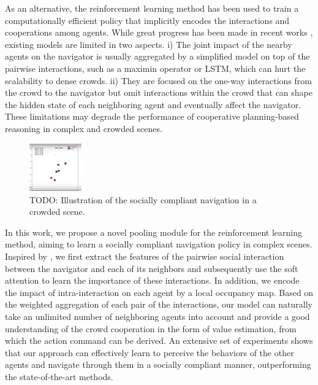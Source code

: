 \documentclass[letterpaper, 10 pt, conference]{ieeeconf}  %
\begin{document}
As an alternative, the reinforcement learning method has been used to train a computationally efficient policy that implicitly encodes the interactions and cooperations among agents. While great progress has been made in recent works \cite{chen_decentralized_2016,chen_socially_2017,long_towards_2017,everett_motion_2018}, existing models are limited in two aspects. i) The joint impact of the nearby agents on the navigator is usually aggregated by a simplified model on top of the pairwise interactions, such as a maximin operator or LSTM, which can hurt the scalability to dense crowds. ii) They are focused on the one-way interactions from the crowd to the navigator but omit interactions within the crowd that can shape the hidden state of each neighboring agent and eventually affect the navigator. These limitations may degrade the performance of cooperative planning-based reasoning in complex and crowded scenes. 

\begin{figure} [t]
  \captionsetup{font=small}
  \includegraphics[width=0.2\textwidth]{figures/overview}
  \caption{TODO: Illustration of the socially compliant navigation in a crowded scene.}
  \label{fig:overview}
\end{figure}

In this work, we propose a novel pooling module for the reinforcement learning method, aiming to learn a socially compliant navigation policy in complex scenes. Inspired by \cite{alahi_social_2016,gupta_social_2018,vemula_social_2017}, we first extract the features of the pairwise social interaction between the navigator and each of its neighbors and subsequently use the soft attention to learn the importance of these interactions. In addition, we encode the impact of intra-interaction on each agent by a local occupancy map. Based on the weighted aggregation of each pair of the interactions, our model can naturally take an unlimited number of neighboring agents into account and provide a good understanding of the crowd cooperation in the form of value estimation, from which the action command can be derived. An extensive set of experiments shows that our approach can effectively learn to perceive the behaviors of the other agents and navigate through them in a socially compliant manner, outperforming the state-of-the-art methods. 
\end{document}
